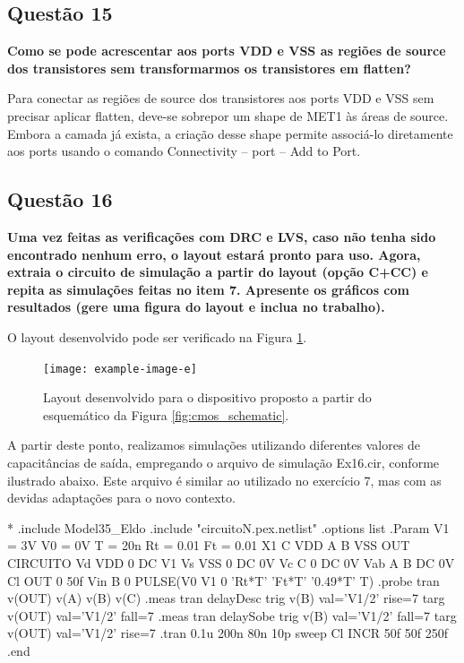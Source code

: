 \documentclass[12pt,a4paper]{article}
\begin{document}
\subsection*{Questão 15}

	\textbf{Como se pode acrescentar aos ports VDD e VSS as regiões de source dos transistores sem transformarmos os transistores em flatten?}

Para conectar as regiões de source dos transistores aos ports VDD e VSS sem precisar aplicar flatten, deve-se sobrepor um shape de MET1 às áreas de source. Embora a camada já exista, a criação desse shape permite associá-lo diretamente aos ports usando o comando Connectivity -- port -- Add to Port.

\subsection*{Questão 16}

	\textbf{Uma vez feitas as verificações com DRC e LVS, caso não tenha sido encontrado nenhum erro, o layout estará pronto para uso. Agora, extraia o circuito de simulação a partir do layout (opção C+CC) e repita as simulações feitas no item 7. Apresente os gráficos com resultados (gere uma figura do layout e inclua no trabalho).}

O layout desenvolvido pode ser verificado na Figura \ref{fig:layout_developed}.

\begin{figure}[H]
    \centering
    \texttt{[image: example-image-e]}
    \caption{Layout desenvolvido para o dispositivo proposto a partir do esquemático da Figura \ref{fig:cmos_schematic}.}
    \label{fig:layout_developed}
\end{figure}

A partir deste ponto, realizamos simulações utilizando diferentes valores de capacitâncias de saída, empregando o arquivo de simulação Ex16.cir, conforme ilustrado abaixo. Este arquivo é similar ao utilizado no exercício 7, mas com as devidas adaptações para o novo contexto.

\begin{codeblock}[title={Exemplo de Simulação}, label={lst:simulation_example}, listing options={language=TeX}]
*
.include Model35_Eldo
.include "circuitoN.pex.netlist"
.options list
.Param V1 = 3V V0 = 0V T = 20n Rt = 0.01 Ft = 0.01
X1 C VDD A B VSS OUT CIRCUITO
Vd VDD 0 DC V1
Vs VSS 0 DC 0V
Vc C 0 DC 0V
Vab A B DC 0V
Cl OUT 0 50f
Vin B 0 PULSE(V0 V1 0 'Rt*T' 'Ft*T' '0.49*T' T)
.probe tran v(OUT) v(A) v(B) v(C)
.meas tran delayDesc trig v(B) val='V1/2' rise=7 targ v(OUT) val='V1/2'
fall=7
.meas tran delaySobe trig v(B) val='V1/2' fall=7 targ v(OUT) val='V1/2'
rise=7
.tran 0.1u 200n 80n 10p sweep Cl INCR 50f 50f 250f
.end
\end{codeblock}
\end{document}
